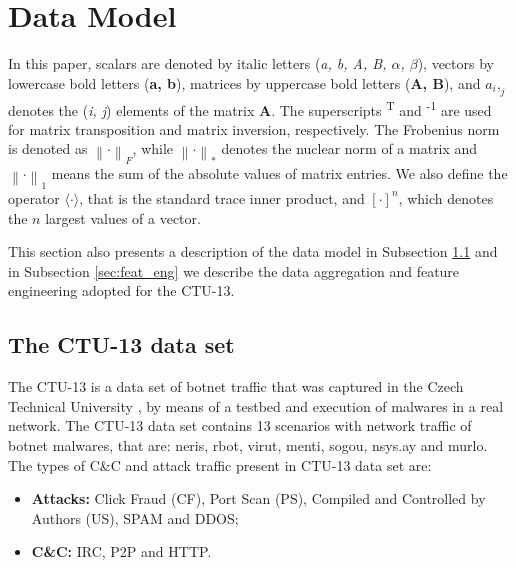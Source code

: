 \documentclass[review]{elsarticle}
\begin{document}
\section{Data Model}
\label{sec:datamodel}

In this paper, scalars are denoted by italic letters (\emph{a, b, A, B, $α$, $β$}), vectors by lowercase bold letters (\textbf{a, b}), matrices by uppercase bold letters (\textbf{A, B}), and $a_i,_j$ denotes the (\emph{i, j}) elements of the matrix \textbf{A}. The superscripts \textsuperscript{T} and \textsuperscript{-1} are used for matrix transposition and matrix inversion, respectively. The Frobenius norm is denoted as $\left\| \mathord{\cdot} \right\|_F$, while $\left\| \mathord{\cdot} \right\|_*$ denotes the nuclear norm of a matrix and $\left\| \mathord{\cdot} \right\|_1$ means the sum of the absolute values of matrix entries. We also define the operator $\langle \mathord{\cdot} \rangle$, that is the standard trace inner product, and $[ \mathord{\cdot} ]^n$, which denotes the $n$ largest values of a vector.

This section also presents a description of the data model in Subsection \ref{sec:CTU-13} and in Subsection \ref{sec:feat_eng} we describe the data aggregation and feature engineering adopted for the CTU-13.

\subsection{The CTU-13 data set}
\label{sec:CTU-13}

The CTU-13 is a data set of botnet traffic that was captured in the Czech Technical University \cite{garcia2014empirical}, by means of a testbed and execution of malwares in a real network. The CTU-13 data set contains 13 scenarios with network traffic of botnet malwares, that are: neris, rbot, virut, menti, sogou, nsys.ay and murlo. The types of C\&C and attack traffic present in CTU-13 data set are:

\begin{itemize}
	\item \textbf{Attacks:} Click Fraud (CF), Port Scan (PS), Compiled and Controlled by Authors (US), SPAM and DDOS;
	\item \textbf{C\&C:} IRC, P2P and HTTP.
\end{itemize}
\end{document}
